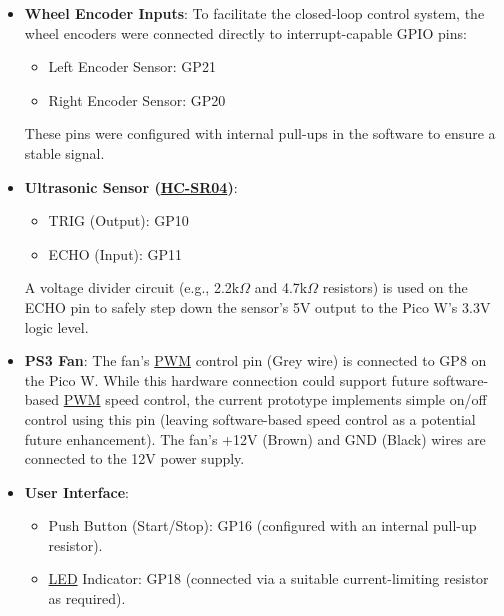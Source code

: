 \begin{itemize}
    
    \item \textbf{Wheel Encoder Inputs}: To facilitate the closed-loop control system, the wheel encoders were connected directly to interrupt-capable GPIO pins:
        \begin{itemize}
            \item Left Encoder Sensor: GP21
            \item Right Encoder Sensor: GP20
        \end{itemize}
        These pins were configured with internal pull-ups in the software to ensure a stable signal.
    \item \textbf{Ultrasonic Sensor (\hyperref[term:hcsr04]{HC-SR04})}:
        \begin{itemize}
            \item TRIG (Output): GP10
            \item ECHO (Input): GP11
        \end{itemize}
        A voltage divider circuit (e.g., 2.2k$\Omega$ and 4.7k$\Omega$ resistors) is used on the ECHO pin to safely step down the sensor’s 5V output to the Pico W’s 3.3V logic level.
    \item \textbf{PS3 Fan}: The fan’s \hyperref[term:pwm]{PWM} control pin (Grey wire) is connected to GP8 on the Pico W. While this hardware connection could support future software-based \hyperref[term:pwm]{PWM} speed control, the current prototype implements simple on/off control using this pin (leaving software-based speed control as a potential future enhancement). The fan’s +12V (Brown) and GND (Black) wires are connected to the 12V power supply.
    \item \textbf{User Interface}:
        \begin{itemize}
            \item Push Button (Start/Stop): GP16 (configured with an internal pull-up resistor).
            \item \hyperref[term:led]{LED} Indicator: GP18 (connected via a suitable current-limiting resistor as required).
        \end{itemize}
\end{itemize}


